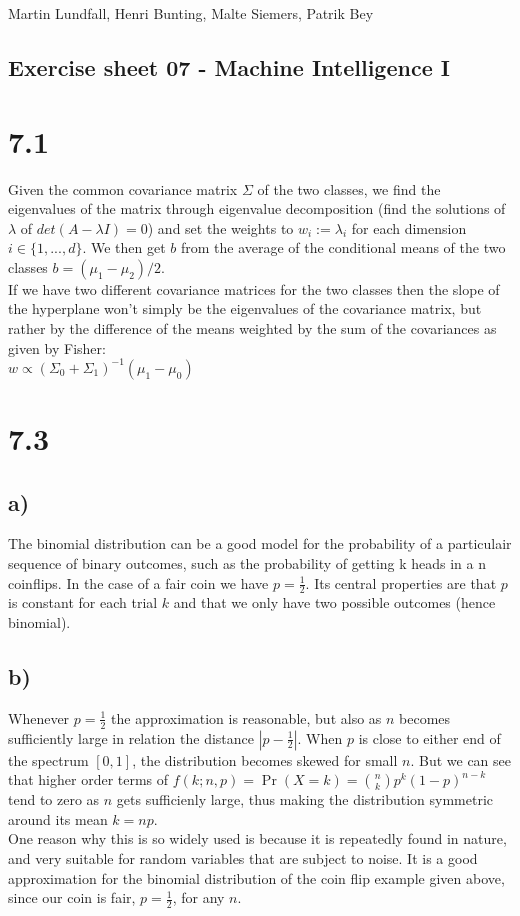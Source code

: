 \documentclass[11pt,a4paper]{article}
\begin{document}
\noindent
Martin Lundfall, Henri Bunting, Malte Siemers, Patrik Bey
\begin{centering}
  \section*{Exercise sheet 07 - Machine Intelligence I}
  \end{centering}
\section*{7.1}
Given the common covariance matrix $\Sigma$ of the two classes, we find the eigenvalues of the matrix through eigenvalue decomposition (find the solutions of $\lambda$ of $det(A - \lambda I)=0$) and set the weights to $w_i := \lambda_i$ for each dimension $i \in \{1,..., d\}$. We then get $b$ from the average of the conditional means of the two classes $b = (\mu_1-\mu_2)/2$.\\
If we have two different covariance matrices for the two classes then the slope of the hyperplane won't simply be the eigenvalues of the covariance matrix, but rather by the difference of the means weighted by the sum of the covariances as given by Fisher:\\
$w \propto (\Sigma_0+\Sigma_1)^{-1}(\mu_1 - \mu_0)$\\
\section*{7.3}
\subsection*{a)}
The binomial distribution can be a good model for the probability of a particulair sequence of binary outcomes, such as the probability of getting k heads in a n coinflips. In the case of a fair coin we have $p = \frac{1}{2}$. Its central properties are that $p$ is constant for each trial $k$ and that we only have two possible outcomes (hence binomial).
\subsection*{b)}
Whenever $p=\frac{1}{2}$ the approximation is reasonable, but also as $n$ becomes sufficiently large in relation the distance $|p
- \frac{1}{2}|$. When $p$ is close to either end of the spectrum $\left[0, 1\right]$, the distribution becomes skewed for small
$n$. But we can see that higher order terms of $f(k;n,p) = \Pr(X = k) = \binom n k  p^k(1-p)^{n-k}$ tend to zero as $n$ gets
sufficienly large, thus making the distribution symmetric around its mean $k= np$. \\
One reason why this is so widely used is because it is repeatedly found in nature, and very suitable for random variables that are subject to noise.
It is a good approximation for the binomial distribution of the coin flip example given above, since our coin is fair, $p=\frac{1}{2}$, for any $n$.
\end{document}
